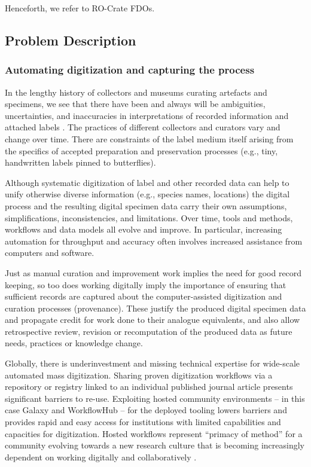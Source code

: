 Henceforth, we refer to RO-Crate FDOs.

\subsection{Problem Description}\label{problem-description}

\subsubsection{Automating digitization and capturing the
process}\label{automating-digitization-and-capturing-the-process}


In the lengthy history of collectors and museums curating artefacts and
specimens, we see that there have been and always will be ambiguities,
uncertainties, and inaccuracies in interpretations of recorded
information and attached labels \cite{ch8-56}. The practices of different
collectors and curators vary and change over time. There are constraints
of the label medium itself arising from the specifics of accepted
preparation and preservation processes (e.g., tiny, handwritten labels
pinned to butterflies).

Although systematic digitization of label and other recorded data can
help to unify otherwise diverse information (e.g., species names,
locations) the digital process and the resulting digital specimen data
carry their own assumptions, simplifications, inconsistencies, and
limitations. Over time, tools and methods, workflows and data models all
evolve and improve. In particular, increasing automation for throughput
and accuracy often involves increased assistance from computers and
software.

Just as manual curation and improvement work implies the need for good
record keeping, so too does working digitally imply the importance of
ensuring that sufficient records are captured about the
computer-assisted digitization and curation processes (provenance).
These justify the produced digital specimen data and propagate credit
for work done to their analogue equivalents, and also allow
retrospective review, revision or recomputation of the produced data as
future needs, practices or knowledge change.

Globally, there is underinvestment and missing technical expertise for
wide-scale automated mass digitization. Sharing proven digitization
workflows via a repository or registry linked to an individual published
journal article presents significant barriers to re-use. Exploiting
hosted community environments -- in this case Galaxy and WorkflowHub --
for the deployed tooling lowers barriers and provides rapid and easy
access for institutions with limited capabilities and capacities for
digitization. Hosted workflows represent ``primacy of method'' for a
community evolving towards a new research culture that is becoming
increasingly dependent on working digitally and collaboratively
\cite{ch8-57,ch8-58}.

